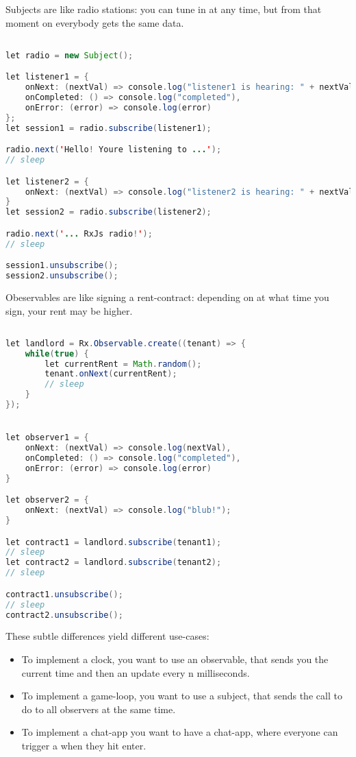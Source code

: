 Subjects are like radio stations: you can tune in at any time, but from that moment on everybody gets the same data.
\begin{lstlisting}[language=java]

let radio = new Subject();

let listener1 = {
    onNext: (nextVal) => console.log("listener1 is hearing: " + nextVal),
    onCompleted: () => console.log("completed"),
    onError: (error) => console.log(error)
};
let session1 = radio.subscribe(listener1);

radio.next('Hello! Youre listening to ...');
// sleep

let listener2 = {
    onNext: (nextVal) => console.log("listener2 is hearing: " + nextVal);
}
let session2 = radio.subscribe(listener2);

radio.next('... RxJs radio!');
// sleep

session1.unsubscribe();
session2.unsubscribe();

\end{lstlisting}

Obeservables are like signing a rent-contract: depending on at what time you sign, your rent may be higher. 
\begin{lstlisting}[language=java]

let landlord = Rx.Observable.create((tenant) => {
    while(true) {
        let currentRent = Math.random();
        tenant.onNext(currentRent);
        // sleep
    }
});


let observer1 = {
    onNext: (nextVal) => console.log(nextVal),
    onCompleted: () => console.log("completed"),
    onError: (error) => console.log(error)
}

let observer2 = {
    onNext: (nextVal) => console.log("blub!");
}

let contract1 = landlord.subscribe(tenant1);
// sleep
let contract2 = landlord.subscribe(tenant2);
// sleep

contract1.unsubscribe();
// sleep
contract2.unsubscribe();

\end{lstlisting}

These subtle differences yield different use-cases: 
\begin{itemize}
    \item To implement a clock, you want to use an observable, that sends you the current time and then an update every n milliseconds. 
    \item To implement a game-loop, you want to use a subject, that sends the call to do  to all observers at the same time. 
    \item To implement a chat-app you want to have a chat-app, where everyone can trigger a  when they hit enter. 
\end{itemize}



